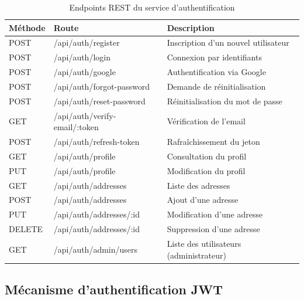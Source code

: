 \begin{table}[H]
    \centering
    \caption{Endpoints REST du service d'authentification}
    \label{tab:endpoints_auth}
    \renewcommand{\arraystretch}{1.2}
    \begin{tabular}{|l|p{4.5cm}|p{5.5cm}|}
        \hline
        \textbf{Méthode} & \textbf{Route} & \textbf{Description} \\
        \hline
        POST & /api/auth/register & Inscription d'un nouvel utilisateur \\
        \hline
        POST & /api/auth/login & Connexion par identifiants \\
        \hline
        POST & /api/auth/google & Authentification via Google \\
        \hline
        POST & /api/auth/forgot-password & Demande de réinitialisation \\
        \hline
        POST & /api/auth/reset-password & Réinitialisation du mot de passe \\
        \hline
        GET & /api/auth/verify-email/:token & Vérification de l'email \\
        \hline
        POST & /api/auth/refresh-token & Rafraîchissement du jeton \\
        \hline
        GET & /api/auth/profile & Consultation du profil \\
        \hline
        PUT & /api/auth/profile & Modification du profil \\
        \hline
        GET & /api/auth/addresses & Liste des adresses \\
        \hline
        POST & /api/auth/addresses & Ajout d'une adresse \\
        \hline
        PUT & /api/auth/addresses/:id & Modification d'une adresse \\
        \hline
        DELETE & /api/auth/addresses/:id & Suppression d'une adresse \\
        \hline
        GET & /api/auth/admin/users & Liste des utilisateurs (administrateur) \\
        \hline
    \end{tabular}
\end{table}



\subsection{Mécanisme d'authentification JWT}

